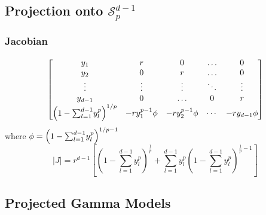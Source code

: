 \documentclass[aspectratio=169]{beamer}
\begin{document}
\subsection*{Projection onto $\mathcal{S}_p^{d-1}$}
\begin{frame}
  \frametitle{Jacobian}
  \begin{equation*}
    \begin{bmatrix}
      y_1 & r & 0 & \ldots & 0\\
      y_2 & 0 & r & \ldots & 0\\
      \vdots & \vdots & \vdots & \ddots & \vdots\\
      y_{d-1} & 0 & \ldots & 0 & r \\
      \left(1 - {\scriptsize\sum_{l=1}^{d-1}}y_l^p\right)^{1/p} &
        - ry_1^{p-1}\phi & -ry_2^{p-1}\phi & \cdots & -ry_{d-1}\phi
    \end{bmatrix}
  \end{equation*}
  where $\phi = \left(1 - {\scriptsize\sum_{l=1}^{d-1}}y_l^p\right)^{1/p - 1}$
  \pause
  \begin{equation*}
  \lvert J \rvert = r^{d-1}\left[\left(1 - {\textstyle\sum}_{l = 1}^{d-1}y_l^p\right)^{\frac{1}{p}} +
      {\textstyle\sum}_{l = 1}^{d-1}y_l^p\left(1 - {\textstyle\sum}_{l=1}^{d-1}
          y_l^p\right)^{\frac{1}{p} - 1}\right]
  \end{equation*}
\end{frame} %


\subsection*{Projected Gamma Models}
\end{document}

